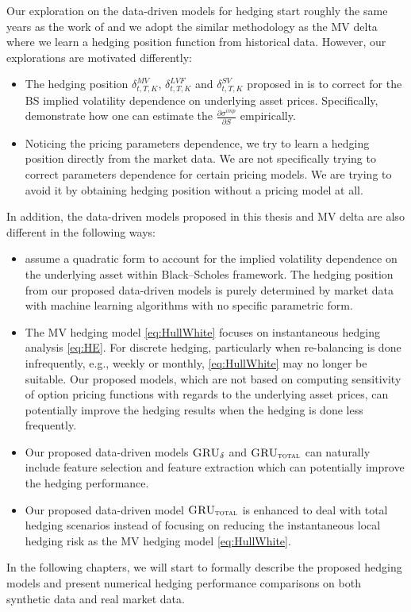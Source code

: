 \documentclass[letterpaper,12pt,titlepage,oneside,final]{book}
\numberwithin{equation}{section}
\theoremstyle{definition}
\newcommand{\model}{\textsc{GRU}_\delta}
\newcommand{\modelT}{\textsc{GRU}_{\textsc{total}}}
\begin{document}
Our exploration on the data-driven models for hedging start roughly the same years as the work of \cite{hulloptimal} and we adopt the similar methodology as the MV delta where we learn a hedging position function from historical data. However, our explorations are motivated differently:
\begin{itemize}
    \item The hedging position  $\delta^{MV}_{t,T,K}$, $\delta^{LVF}_{t,T,K}$ and $\delta^{SV}_{t,T,K}$ proposed in \cite{hulloptimal} is to correct for the BS implied volatility dependence on underlying asset prices. Specifically, \citet{hulloptimal} demonstrate how one can estimate the $\frac{\partial \sigma^{imp}}{\partial S}$ empirically.
    \item Noticing the pricing parameters dependence, we try to learn a hedging position directly from the market data.  We are not specifically trying to correct  parameters dependence for certain pricing models. We are trying to avoid it  by obtaining hedging position without a pricing model at all.
\end{itemize}
In addition, the data-driven models proposed in this thesis and MV delta are also different in the following ways:
\begin{itemize}
    \item \citet{hulloptimal} assume a quadratic form to account for the implied volatility dependence on the underlying asset within Black–Scholes framework.  The hedging position from our proposed data-driven models is  purely determined by market data with machine learning algorithms with no specific parametric form.
    \item The MV hedging model \eqref{eq:HullWhite} focuses on instantaneous hedging analysis  \eqref{eq:HE}. For discrete hedging, particularly when re-balancing is done infrequently, e.g., weekly or monthly, \eqref{eq:HullWhite}   may no longer be suitable. Our proposed models, which are not based on computing sensitivity of option pricing functions with regards to the underlying asset prices, can potentially improve the hedging results when the hedging is done less frequently.
    \item Our proposed data-driven models $\model$ and $\modelT$ can naturally include feature selection and feature extraction which can potentially improve the hedging performance.
    \item Our proposed data-driven model $\modelT$ is enhanced to deal with total hedging scenarios instead of focusing on reducing the instantaneous local hedging risk as the   MV hedging model \eqref{eq:HullWhite}.
\end{itemize}
In the following chapters, we will start to formally describe the proposed hedging models and present numerical hedging performance comparisons on both synthetic data and real market data.
\end{document}

